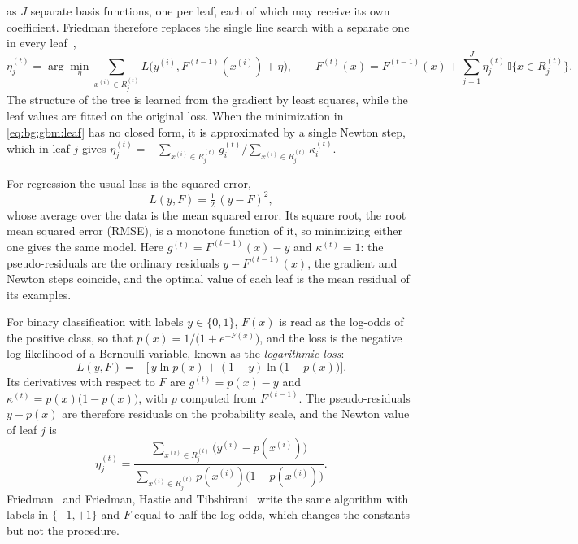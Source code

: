     as $J$ separate basis functions, one per leaf, each of which may receive its
    own coefficient. Friedman therefore replaces the single line search with a
    separate one in every leaf~\cite{friedman2001},
    \begin{equation}
    \eta_j^{(t)} = \arg\min_{\eta}
    \sum_{x^{(i)} \in R_j^{(t)}} L\bigl( y^{(i)}, F^{(t-1)}(x^{(i)}) + \eta \bigr),
    \qquad
    F^{(t)}(x) = F^{(t-1)}(x) + \sum_{j=1}^{J} \eta_j^{(t)}\,
    \mathbb{I}{\{x \in R_j^{(t)}\}}.
    \label{eq:bg:gbm:leaf}
    \end{equation}
    The structure of the tree is learned from the gradient by least squares, while
    the leaf values are fitted on the original loss. When the minimization in
    \eqref{eq:bg:gbm:leaf} has no closed form, it is approximated by a single
    Newton step, which in leaf $j$ gives
    $\eta_j^{(t)} = -\sum_{x^{(i)} \in R_j^{(t)}} g_i^{(t)} \big/
    \sum_{x^{(i)} \in R_j^{(t)}} \kappa_i^{(t)}$.
    
    For regression the usual loss is the squared error,
    \begin{equation}
    L(y, F) = \tfrac{1}{2}\,(y - F)^{2},
    \label{eq:bg:gbm:mse}
    \end{equation}
    whose average over the data is the mean squared error. Its square root, the
    root mean squared error (RMSE), is a monotone function of it, so minimizing
    either one gives the same model. Here $g^{(t)} = F^{(t-1)}(x) - y$ and
    $\kappa^{(t)} = 1$: the pseudo-residuals are the ordinary residuals
    $y - F^{(t-1)}(x)$, the gradient and Newton steps coincide, and the optimal
    value of each leaf is the mean residual of its examples.
    
    For binary classification with labels $y \in \{0, 1\}$, $F(x)$ is read as the
    log-odds of the positive class, so that
    $p(x) = 1 / \bigl(1 + e^{-F(x)}\bigr)$, and the loss is the negative
    log-likelihood of a Bernoulli variable, known as the \emph{logarithmic loss}:
    \begin{equation}
    L(y, F) = -\bigl[\, y \ln p(x) + (1 - y) \ln\bigl(1 - p(x)\bigr) \bigr].
    \label{eq:bg:gbm:logloss}
    \end{equation}
    Its derivatives with respect to $F$ are $g^{(t)} = p(x) - y$ and
    $\kappa^{(t)} = p(x)\bigl(1 - p(x)\bigr)$, with $p$ computed from
    $F^{(t-1)}$. The pseudo-residuals $y - p(x)$ are therefore residuals on the
    probability scale, and the Newton value of leaf $j$ is
    \begin{equation}
    \eta_j^{(t)} =
    \frac{\sum_{x^{(i)} \in R_j^{(t)}} \bigl( y^{(i)} - p(x^{(i)}) \bigr)}
         {\sum_{x^{(i)} \in R_j^{(t)}} p(x^{(i)}) \bigl( 1 - p(x^{(i)}) \bigr)}.
    \label{eq:bg:gbm:loglossleaf}
    \end{equation}
    Friedman~\cite{friedman2001} and Friedman, Hastie and
    Tibshirani~\cite{friedman2000} write the same algorithm with labels in
    $\{-1, +1\}$ and $F$ equal to half the log-odds, which changes the constants
    but not the procedure.
    
